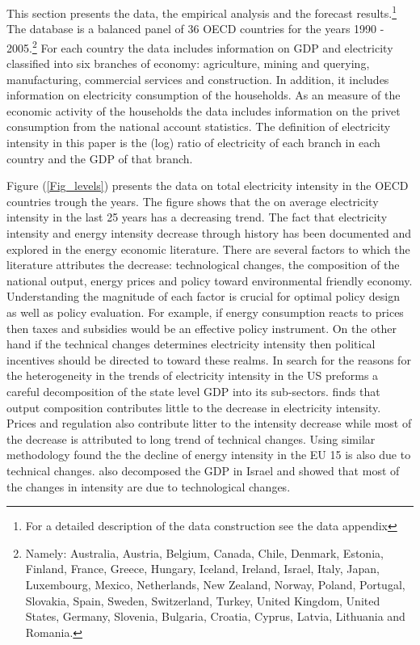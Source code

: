 \documentclass[]{amsart}
\begin{document}
This section presents the data, the empirical analysis and the forecast results.\footnote{For a detailed description of the data construction see the data appendix} The database is a balanced panel of 36 OECD countries for the years 1990 - 2005.\footnote{Namely:
Australia, Austria, Belgium, Canada, Chile, Denmark, Estonia, Finland, France, Greece, Hungary, Iceland, Ireland, Israel, Italy, Japan, Luxembourg, Mexico, Netherlands, New Zealand, Norway, Poland, Portugal, Slovakia, Spain, Sweden, Switzerland, Turkey, United Kingdom, United States, Germany, Slovenia, Bulgaria, Croatia, Cyprus, Latvia, Lithuania and Romania.} For each country the data includes information on GDP and electricity classified into six branches of economy: agriculture, mining and querying, manufacturing, commercial services and construction. In addition, it includes information on electricity consumption of the households. As an measure of the economic activity of the households the data includes information on the privet consumption from the national account statistics. 
The definition of electricity intensity in this paper is the (log) ratio of electricity of each branch in each country and the GDP of that branch.

\bigskip

Figure (\ref{Fig_levels}) presents the data on total electricity intensity in the OECD countries trough the years. The figure shows that the on average electricity intensity in the last 25 years has a decreasing trend. The fact that electricity intensity and energy intensity decrease through history has been documented and explored in the energy economic literature. There are several factors to which the literature attributes the decrease: technological changes, the composition of the national output, energy prices and policy toward environmental friendly economy. Understanding the magnitude of each factor is crucial for optimal policy design as well as policy evaluation. For example, if energy consumption reacts to prices then taxes and subsidies would be an effective policy instrument. On the other hand if the technical changes determines electricity intensity then political incentives should be directed to toward these realms. In search for the reasons for the heterogeneity in the trends of electricity intensity in the US \cite{Levinson2016} preforms a careful decomposition of the state level GDP into its sub-sectors. \cite{Levinson2016} finds that output composition contributes little to the decrease in electricity intensity. Prices and regulation also contribute litter to the intensity decrease while most of the decrease is attributed to long trend of technical changes. Using similar methodology  \cite{marrero2013activity} found the the decline of energy intensity in the EU 15 is also due to technical changes. \cite{Gallo2017} also decomposed the GDP in Israel and showed that most of the changes in intensity are due to technological changes.
\end{document}
